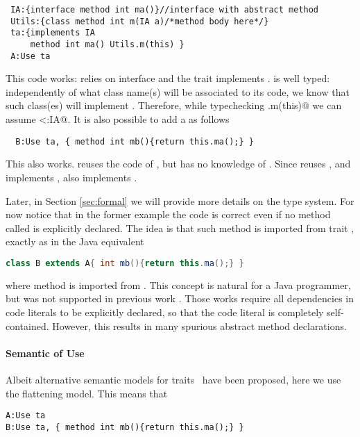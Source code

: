 \begin{lstlisting}
 IA:{interface method int ma()}//interface with abstract method
 Utils:{class method int m(IA a)/*method body here*/}
 ta:{implements IA
     method int ma() Utils.m(this) }
 A:Use ta
\end{lstlisting}

This code works: \Q@Utils@ relies on interface \Q@IA@ and the trait \Q@ta@
implements \Q@IA@.
\Q@ta@ is well typed: independently of what class name(s) will be
associated to its code, we know that such class(es) will implement
\Q@IA@. 
Therefore, while typechecking \Q@Utils.m(this)@ we can assume
\Q@this<:IA@.
 It is also possible to add a \Q@B@ as follows
\begin{lstlisting}
  B:Use ta, { method int mb(){return this.ma();} }
\end{lstlisting}
This also works.  \Q@B@ reuses the code of \Q@ta@, but has no knowledge of \Q@A@.
Since \Q@B@ reuses \Q@ta@, and \Q@ta@ implements \Q@IA@, also \Q@B@ implements \Q@IA@. 

Later, in Section \ref{sec:formal} we will provide more details on the type
system. 
For now notice that in the former example the code is correct even if
no method called \Q@ma@ is explicitly declared.
The idea is that such method is imported from trait \Q@ta@, exactly as in the Java equivalent
\begin{lstlisting}[language=Java]
  class B extends A{ int mb(){return this.ma();} }  
\end{lstlisting}
where method \Q@ma@ is imported from \Q@A@.
This concept is natural for a Java programmer, but was not supported
in previous work \cite{Damiani2014,deep}. Those works require all
dependencies in code literals to be explicitly declared, so that the
code literal is completely self-contained. However, this results in
many spurious abstract method declarations. 

\paragraph*{Semantic of Use}
Albeit alternative semantic models for traits~\cite{Traits:ECOOP2003} have been proposed,
here we use the flattening model. This means that 
\begin{lstlisting}
A:Use ta
B:Use ta, { method int mb(){return this.ma();} }
\end{lstlisting}
 
